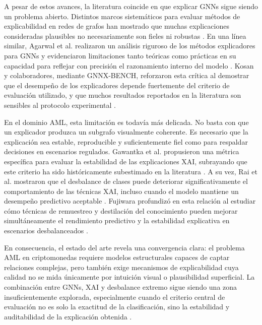 \bigskip

A pesar de estos avances, la literatura coincide en que explicar GNNs sigue siendo un problema abierto. Distintos marcos sistemáticos para evaluar métodos de explicabilidad en redes de grafos han mostrado que muchas explicaciones consideradas plausibles no necesariamente son fieles ni robustas \cite{Armgaan2025GnnXemplar:Interpretability}. En una línea similar, Agarwal et al. realizaron un análisis riguroso de los métodos explicadores para GNNs y evidenciaron limitaciones tanto teóricas como prácticas en su capacidad para reflejar con precisión el razonamiento interno del modelo \cite{Agarwal2022ProbingMethods}. Kosan y colaboradores, mediante GNNX-BENCH, reforzaron esta crítica al demostrar que el desempeño de los explicadores depende fuertemente del criterio de evaluación utilizado, y que muchos resultados reportados en la literatura son sensibles al protocolo experimental \cite{Kosan2023GNNX-BENCH:Benchmarking}.

\bigskip

En el dominio AML, esta limitación es todavía más delicada. No basta con que un explicador produzca un subgrafo visualmente coherente. Es necesario que la explicación sea estable, reproducible y suficientemente fiel como para respaldar decisiones en escenarios regulados. Gawantka et al. propusieron una métrica específica para evaluar la estabilidad de las explicaciones XAI, subrayando que este criterio ha sido históricamente subestimado en la literatura \cite{Gawantka2024AExplanations}. A su vez, Rai et al. mostraron que el desbalance de clases puede deteriorar significativamente el comportamiento de las técnicas XAI, incluso cuando el modelo mantiene un desempeño predictivo aceptable \cite{Rai2025EvaluatingData}. Fujiwara profundizó en esta relación al estudiar cómo técnicas de remuestreo y destilación del conocimiento pueden mejorar simultáneamente el rendimiento predictivo y la estabilidad explicativa en escenarios desbalanceados \cite{Fujiwara2024KnowledgeStability}.

\bigskip

En consecuencia, el estado del arte revela una convergencia clara: el problema AML en criptomonedas requiere modelos estructurales capaces de captar relaciones complejas, pero también exige mecanismos de explicabilidad cuya calidad no se mida únicamente por intuición visual o plausibilidad superficial. La combinación entre GNNs, XAI y desbalance extremo sigue siendo una zona insuficientemente explorada, especialmente cuando el criterio central de evaluación no es solo la exactitud de la clasificación, sino la estabilidad y auditabilidad de la explicación obtenida \cite{Unagar2025SurveyXAI, Gawantka2024AExplanations, Rai2025EvaluatingData}.

